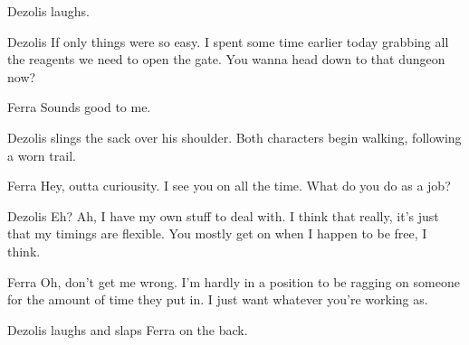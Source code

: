 Dezolis laughs.

\begin{dialogue}{Dezolis}
If only things were so easy.
I spent some time earlier today grabbing all the reagents we need to open the gate.
You wanna head down to that dungeon now?
\end{dialogue}

\begin{dialogue}{Ferra}
Sounds good to me.
\end{dialogue}

Dezolis slings the sack over his shoulder.
Both characters begin walking, following a worn trail.

\begin{dialogue}{Ferra}
Hey, outta curiousity.
I see you on all the time.
What do you do as a job?
\end{dialogue}

\begin{dialogue}{Dezolis}
Eh?
Ah, I have my own stuff to deal with.
I think that really, it's just that my timings are flexible.
You mostly get on when I happen to be free, I think.
\end{dialogue}

\begin{dialogue}{Ferra}
Oh, don't get me wrong.
I'm hardly in a position to be ragging on someone for the amount of time they put in.
I just want whatever you're working as.
\end{dialogue}

Dezolis laughs and slaps Ferra on the back.


